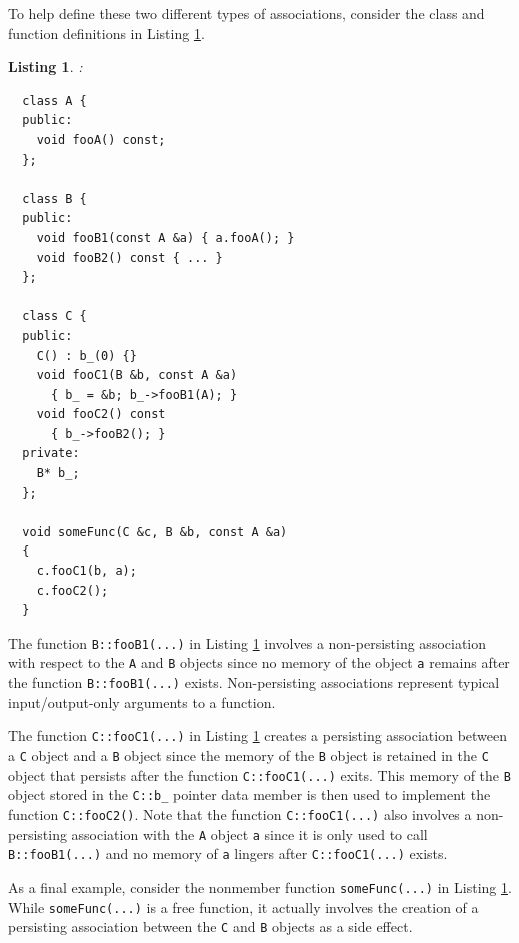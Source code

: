 \documentclass[pdf,ps2pdf,11pt]{SANDreport}
\newtheorem{listing}{Listing}
\begin{document}
To help define these two different types of associations, consider the
class and function definitions in Listing
{}\ref{listing:NonPersistingPersistingAssociationsRawPointers}.

\begin{listing}:\\
\label{listing:NonPersistingPersistingAssociationsRawPointers}
{\small\begin{verbatim}
  class A {
  public:
    void fooA() const;
  };

  class B {
  public:
    void fooB1(const A &a) { a.fooA(); }
    void fooB2() const { ... }
  };

  class C {
  public:
    C() : b_(0) {}
    void fooC1(B &b, const A &a)
      { b_ = &b; b_->fooB1(A); }
    void fooC2() const
      { b_->fooB2(); }
  private:
    B* b_;    
  };

  void someFunc(C &c, B &b, const A &a)
  {
    c.fooC1(b, a);
    c.fooC2();
  }
\end{verbatim}}
\end{listing}

The function {}\texttt{B::fooB1(...)} in Listing
{}\ref{listing:NonPersistingPersistingAssociationsRawPointers}
involves a non-persisting association with respect to the {}\texttt{A}
and {}\texttt{B} objects since no memory of the object {}\texttt{a}
remains after the function {}\texttt{B::fooB1(...)} exists.
Non-persisting associations represent typical input/output-only
arguments to a function.

The function {}\texttt{C::fooC1(...)} in Listing
{}\ref{listing:NonPersistingPersistingAssociationsRawPointers} creates
a persisting association between a {}\texttt{C} object and a
{}\texttt{B} object since the memory of the {}\texttt{B} object is
retained in the {}\texttt{C} object that persists after the function
{}\texttt{C::fooC1(...)} exits.  This memory of the {}\texttt{B}
object stored in the {}\texttt{C::b\_} pointer data member is then
used to implement the function {}\texttt{C::fooC2()}.  Note that the
function {}\texttt{C::fooC1(...)} also involves a non-persisting
association with the {}\texttt{A} object {}\texttt{a} since it is only
used to call {}\texttt{B::fooB1(...)} and no memory of {}\texttt{a}
lingers after {}\texttt{C::fooC1(...)} exists.

As a final example, consider the nonmember function
{}\texttt{someFunc(...)} in Listing
{}\ref{listing:NonPersistingPersistingAssociationsRawPointers}.  While
{}\texttt{someFunc(...)} is a free function, it actually involves the
creation of a persisting association between the {}\texttt{C} and
{}\texttt{B} objects as a side effect.
\end{document}
